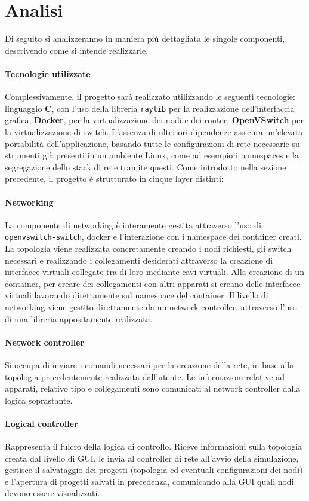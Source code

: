 \section{Analisi}
Di seguito si analizzeranno in maniera più dettagliata le singole componenti, descrivendo come si intende realizzarle. 
\paragraph*{Tecnologie utilizzate} Complessivamente, il progetto sarà realizzato utilizzando le seguenti tecnologie: linguaggio \textbf{C}, con l'uso della libreria \texttt{raylib} per la realizzazione dell'interfaccia grafica; \textbf{Docker}, per la virtualizzazione dei nodi e dei router; \textbf{OpenVSwitch} per la virtualizzazione di switch. L'assenza di ulteriori dipendenze assicura un'elevata portabilità dell'applicazione, basando tutte le configurazioni di rete necessarie su strumenti già presenti in un ambiente Linux, come ad esempio i namespaces e la segregazione dello stack di rete tramite questi. 
\newline\newline
Come introdotto nella sezione precedente, il progetto è strutturato in cinque layer distinti:
\paragraph*{Networking} La componente di networking è interamente gestita attraverso l'uso di \texttt{openvswitch-switch}, docker e l'interazione con i namespace dei container creati. La topologia viene realizzata concretamente creando i nodi richiesti, gli switch necessari e realizzando i collegamenti desiderati attraverso la creazione di interfacce virtuali collegate tra di loro mediante cavi virtuali. Alla creazione di un container, per creare dei collegamenti con altri apparati si creano delle interfacce virtuali lavorando direttamente sul namespace del container. Il livello di networking viene gestito direttamente da un network controller, attraverso l'uso di una libreria appositamente realizzata. 
\paragraph*{Network controller} Si occupa di inviare i comandi necessari per la creazione della rete, in base alla topologia precedentemente realizzata dall'utente. Le informazioni relative ad apparati, relativo tipo e collegamenti sono comunicati al network controller dalla logica soprastante. 
\paragraph*{Logical controller} Rappresenta il fulcro della logica di controllo. Riceve informazioni sulla topologia creata dal livello di GUI, le invia al controller di rete all'avvio della simulazione, gestisce il salvataggio dei progetti (topologia ed eventuali configurazioni dei nodi) e l'apertura di progetti salvati in precedenza, comunicando alla GUI quali nodi devono essere visualizzati. 

